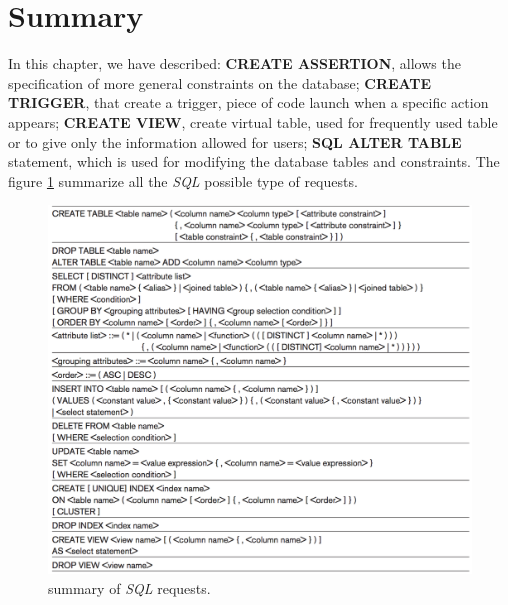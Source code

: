 \section{Summary}
In this chapter, we have described: \textbf{CREATE ASSERTION}, allows the specification of more general constraints on the database; 
\textbf{CREATE TRIGGER}, that create a trigger, piece of code launch when a specific action appears; \textbf{CREATE VIEW}, create virtual table, used for frequently used table or to give only the information allowed for users; \textbf{SQL ALTER TABLE} statement, which is used for modifying the database tables and constraints. The figure \ref{7-2} summarize all the \textit{SQL} possible type of requests.
\begin{figure}[H]
    \centering
    \includegraphics[scale = 0.5]{img/chap7-2}
    \caption{summary of \textit{SQL} requests.}
    \label{7-2}
\end{figure}
